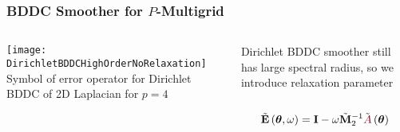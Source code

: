 \documentclass{beamer}
\begin{document}

\begin{frame}
\begin{center}
\frametitle{BDDC Smoother for $P$-Multigrid}

\begin{columns}[onlytextwidth]
  \begin{column}{0.49\textwidth}
  \begin{center}
  \texttt{[image: DirichletBDDCHighOrderNoRelaxation]}
  {\small Symbol of error operator for Dirichlet BDDC of 2D Laplacian for $p = 4$}
  \end{center}
  \end{column}

  \begin{column}{0.45\textwidth}
  \begin{center}
  Dirichlet BDDC smoother still has large spectral radius, so we introduce relaxation parameter\\

  ~\\

  \begin{equation}
  \tilde{\mathbf{E}} \left( \boldsymbol{\theta}, \omega \right) = \mathbf{I} - \omega \tilde{\mathbf{M}}_2^{-1} \tilde{{\color{burgundy}A}} \left( \boldsymbol{\theta} \right)
  \end{equation}
  \end{center}
  \end{column}
\end{columns}

\end{center}
\end{frame}

\end{document}
